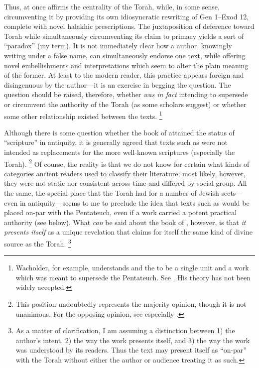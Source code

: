 \noindent
Thus, \jub at once affirms the centrality of the Torah, while, in some sense, circumventing it by providing its own idiosyncratic rewriting of Gen 1--Exod 12, complete with novel halakhic prescriptions. The juxtaposition of deference toward Torah while simultaneously circumventing its claim to primacy yields a sort of ``\psgraphical paradox'' (my term). It is not immediately clear how a \psgraphical author, knowingly writing under a false name, can simultaneously endorse one text, while offering novel embellishments and interpretations which seem to alter the plain meaning of the former. At least to the modern reader, this practice appears foreign and disingenuous by the \psgraphical author---it is an exercise in begging the question. The question should be raised, therefore, whether \jub \emph{was in fact} intending to supersede or circumvent the authority of the Torah (as some scholars suggest) or whether some other relationship existed between the texts.%
    \footnote{Wacholder, for example, understands \jub and the \templescroll to be a single unit and a work which was meant to supersede the Pentateuch. See \cite{wacholder_kampen-etal1997}. His theory has not been widely accepted.}

Although there is some question whether the book of \jub attained the status of ``scripture'' in antiquity, it is generally agreed that \psgraphical texts such as \jub were not intended as replacements for the more well-known scriptures (especially the Torah).%
    \footnote{This position undoubtedly represents the majority opinion, though it is not unanimous. For the opposing opinion, see especially \cite{wacholder_kampen-etal1997}.}
Of course, the reality is that we do not know for certain what kinds of categories ancient readers used to classify their literature; most likely, however, they were not static nor consistent across time and differed by social group. All the same, the special place that the Torah had for a number of Jewish sects---even in antiquity---seems to me to preclude the idea that \psgraphical texts such as \jub would be placed on-par with the Pentateuch, even if a work carried a potent practical authority (see below). What \emph{can} be said about the book of \jub, however, is that \emph{it presents itself} as a unique revelation that claims for itself the same kind of divine source as the Torah.%
    \footnote{As a matter of clarification, I am assuming a distinction between 1) the author's intent, 2) the way the work presents itself, and 3) the way the work was understood by its readers. Thus the text may present itself as ``on-par'' with the Torah without either the author or audience treating it as such.}

